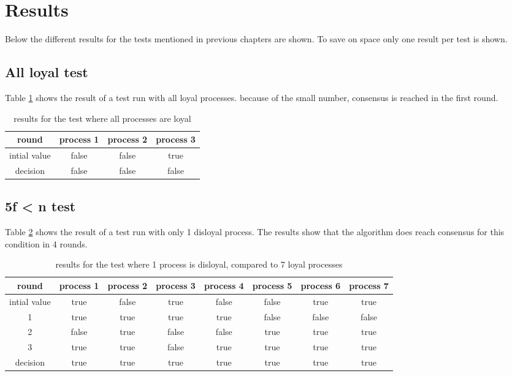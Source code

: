 \section{Results}

Below the different results for the tests mentioned in previous chapters are shown. To save on space only one result per test is shown.

\subsection{All loyal test}
Table \ref{table:resultsAllLoyal} shows the result of a test run with all loyal processes. because of the small number, consensus is reached in the first round.


\begin{table}[h]
	\begin{tabular}{ | c | c  | c  | c| }
		\hline
  		round & process 1 & process 2 & process 3 \\
		\hline
 		intial value &  false & false & true  \\
		\hline
  		decision  & false & false & false  \\
		\hline
	\end{tabular}
	\caption{results for the test where all processes are loyal}	
	\label{table:resultsAllLoyal}
\end{table}

\subsection{5f < n test}
Table \ref{table:resultsFewDisloyal} shows the result of a test run with only 1 disloyal process.
The results show that the algorithm does reach consensus for this condition in 4 rounds.


\begin{table}[h]
	\begin{tabular}{ | c | c  | c  | c| c | c | c | c |}
		\hline
  		round & process 1 & process 2 & process 3 & process 4 & process 5 & process 6 & process 7 \\
		\hline
 		intial value &  true & false & true  & false & false & true & true \\
		\hline
		1  &  true & true & true  & true & false & false & false \\
		\hline
		2  &  false & true & false  & false & true & true & true \\
		\hline
		3  &  true & true & false  & true & true & true & true \\
		\hline
  		decision  &  true & true & true  & true & true & true & true  \\
		\hline
	\end{tabular}
	\caption{results for the test where 1 process is disloyal, compared to 7 loyal processes}	
	\label{table:resultsFewDisloyal}
\end{table}

